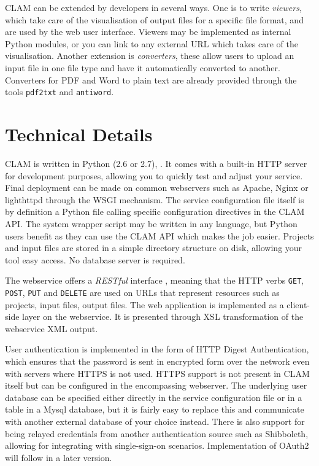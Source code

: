 \documentclass[11pt]{article}
\begin{document}
CLAM can be extended by developers in several ways. One is to write
\emph{viewers}, which take care of the visualisation of output files for a
specific file format, and are used by the web user interface. Viewers may be
implemented as internal Python modules, or you can link to any external URL
which takes care of the visualisation. Another extension is
\emph{converters}, these allow users to upload an input file in one file type and have it
automatically converted to another. Converters for PDF and Word to plain text are already
provided through the tools \texttt{pdf2txt} and \texttt{antiword}.

\section{Technical Details}

CLAM is written in Python (2.6 or 2.7), \cite{PYTHON}. It comes with a built-in HTTP server for
development purposes, allowing you to quickly test and adjust your service.
Final deployment can be made on common webservers such as Apache, Nginx or lighthttpd
through the WSGI mechanism. The service configuration file itself is by
definition a Python file calling specific configuration directives in the CLAM
API. The system wrapper script may be written in any language, but Python users
benefit as they can use the CLAM API which makes the job easier. Projects and
input files are stored in a simple directory structure on disk, allowing your
tool easy access. No database server is required.

The webservice offers a \emph{RESTful} interface \cite{REST}, meaning that the HTTP
verbs \texttt{GET}, \texttt{POST}, \texttt{PUT} and \texttt{DELETE} are used on
URLs that represent resources such as projects, input files, output files. The
web application is implemented as a client-side layer on the webservice. It is
presented through XSL transformation \cite{XSLT} of the webservice XML output.

User authentication is implemented in the form of HTTP Digest Authentication,
which ensures that the password is sent in encrypted form over the network even
with servers where HTTPS is not used. HTTPS support is not present in CLAM
itself but can be configured in the encompassing webserver. The underlying user
database can be specified either directly in the service configuration file or
in a table in a Mysql database, but it is fairly easy to replace this and
communicate with another external database of your choice instead. There is
also support for being relayed credentials from another authentication source
such as Shibboleth, allowing for integrating with single-sign-on scenarios.
Implementation of OAuth2 will follow in a later version.
\end{document}
